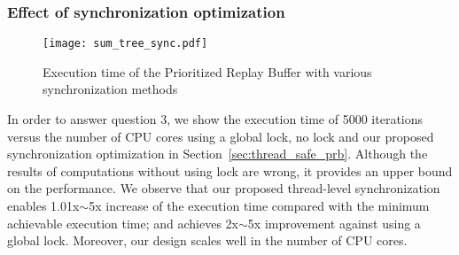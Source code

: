 \subsubsection{Effect of synchronization optimization}

\begin{figure}
    \centering
    \texttt{[image: sum\_tree\_sync.pdf]}
    \caption{Execution time of the Prioritized Replay Buffer with various synchronization methods}
    \label{fig:scalability}
\end{figure}
In order to answer question 3, we show the execution time of 5000 iterations versus the number of CPU cores using a global lock, no lock and our proposed synchronization optimization in Section~\ref{sec:thread_safe_prb}. Although the results of computations without using lock are wrong, it provides an upper bound on the performance. We observe that our proposed thread-level synchronization enables 1.01x$\sim$5x increase of the execution time compared with the minimum achievable execution time; and achieves 2x$\sim$5x improvement against using a global lock. Moreover, our design scales well in the number of CPU cores.









